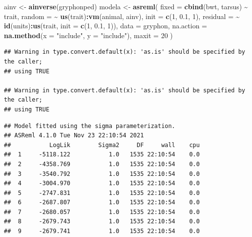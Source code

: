 \documentclass[
  12pt,
]{book}
\newenvironment{Shaded}{\begin{snugshade}}{\end{snugshade}}
\newcommand{\DataTypeTok}[1]{\textcolor[rgb]{0.13,0.29,0.53}{#1}}
\newcommand{\DecValTok}[1]{\textcolor[rgb]{0.00,0.00,0.81}{#1}}
\newcommand{\FloatTok}[1]{\textcolor[rgb]{0.00,0.00,0.81}{#1}}
\newcommand{\KeywordTok}[1]{\textcolor[rgb]{0.13,0.29,0.53}{\textbf{#1}}}
\newcommand{\NormalTok}[1]{#1}
\newcommand{\OperatorTok}[1]{\textcolor[rgb]{0.81,0.36,0.00}{\textbf{#1}}}
\newcommand{\StringTok}[1]{\textcolor[rgb]{0.31,0.60,0.02}{#1}}
\begin{document}
\begin{Shaded}
\begin{Highlighting}[]
\NormalTok{ainv \textless{}{-}}\StringTok{ }\KeywordTok{ainverse}\NormalTok{(gryphonped)}
\NormalTok{modela \textless{}{-}}\StringTok{ }\KeywordTok{asreml}\NormalTok{(}
  \DataTypeTok{fixed =} \KeywordTok{cbind}\NormalTok{(bwt, tarsus) }\OperatorTok{\textasciitilde{}}\StringTok{ }\NormalTok{trait,}
  \DataTypeTok{random =} \OperatorTok{\textasciitilde{}}\StringTok{ }\KeywordTok{us}\NormalTok{(trait)}\OperatorTok{:}\KeywordTok{vm}\NormalTok{(animal, ainv), }\DataTypeTok{init =} \KeywordTok{c}\NormalTok{(}\DecValTok{1}\NormalTok{, }\FloatTok{0.1}\NormalTok{, }\DecValTok{1}\NormalTok{),}
  \DataTypeTok{residual =} \OperatorTok{\textasciitilde{}}\StringTok{ }\KeywordTok{id}\NormalTok{(units)}\OperatorTok{:}\KeywordTok{us}\NormalTok{(trait, }\DataTypeTok{init =} \KeywordTok{c}\NormalTok{(}\DecValTok{1}\NormalTok{, }\FloatTok{0.1}\NormalTok{, }\DecValTok{1}\NormalTok{)),}
  \DataTypeTok{data =}\NormalTok{ gryphon,}
  \DataTypeTok{na.action =} \KeywordTok{na.method}\NormalTok{(}\DataTypeTok{x =} \StringTok{"include"}\NormalTok{, }\DataTypeTok{y =} \StringTok{"include"}\NormalTok{),}
  \DataTypeTok{maxit =} \DecValTok{20}
\NormalTok{)}
\end{Highlighting}
\end{Shaded}

\begin{verbatim}
## Warning in type.convert.default(x): 'as.is' should be specified by the caller;
## using TRUE

## Warning in type.convert.default(x): 'as.is' should be specified by the caller;
## using TRUE
\end{verbatim}

\begin{verbatim}
## Model fitted using the sigma parameterization.
## ASReml 4.1.0 Tue Nov 23 22:10:54 2021
##           LogLik        Sigma2     DF     wall    cpu
##  1     -5118.122           1.0   1535 22:10:54    0.0
##  2     -4358.769           1.0   1535 22:10:54    0.0
##  3     -3540.792           1.0   1535 22:10:54    0.0
##  4     -3004.970           1.0   1535 22:10:54    0.0
##  5     -2747.831           1.0   1535 22:10:54    0.0
##  6     -2687.807           1.0   1535 22:10:54    0.0
##  7     -2680.057           1.0   1535 22:10:54    0.0
##  8     -2679.743           1.0   1535 22:10:54    0.0
##  9     -2679.741           1.0   1535 22:10:54    0.0
\end{verbatim}
\end{document}
